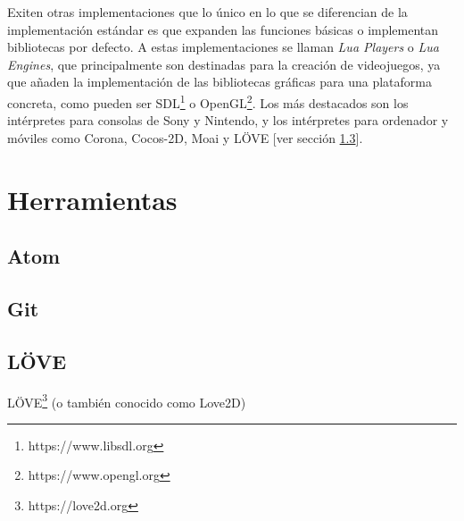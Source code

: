Exiten otras implementaciones que lo único en lo que se diferencian de la implementación estándar es que expanden las funciones básicas o implementan bibliotecas por defecto. A estas implementaciones se llaman \textit{Lua Players} o \textit{Lua Engines}, que principalmente son destinadas para la creación de videojuegos, ya que añaden la implementación de las bibliotecas gráficas para una plataforma concreta, como pueden ser SDL\footnote{https://www.libsdl.org} o OpenGL\footnote{https://www.opengl.org}. Los más destacados son los intérpretes para consolas de Sony y Nintendo, y los intérpretes para ordenador y móviles como Corona, Cocos-2D, Moai y LÖVE [ver sección \ref{subsec:love2d}]. \\

\section{Herramientas}

\subsection{Atom}

\subsection{Git}

\subsection{LÖVE}\label{subsec:love2d}

LÖVE\footnote{https://love2d.org} (o también conocido como Love2D)